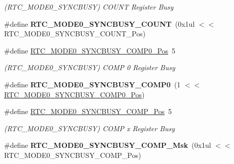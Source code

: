 \begin{DoxyCompactItemize}
\begin{DoxyCompactList}\small\item\em (R\+T\+C\+\_\+\+M\+O\+D\+E0\+\_\+\+S\+Y\+N\+C\+B\+U\+S\+Y) C\+O\+U\+N\+T Register Busy \end{DoxyCompactList}\item 
\hypertarget{group___s_a_m_l21___r_t_c_gac6ea088f1afca302a326d9d2e3dc4095}{}\#define {\bfseries R\+T\+C\+\_\+\+M\+O\+D\+E0\+\_\+\+S\+Y\+N\+C\+B\+U\+S\+Y\+\_\+\+C\+O\+U\+N\+T}~(0x1ul $<$$<$ R\+T\+C\+\_\+\+M\+O\+D\+E0\+\_\+\+S\+Y\+N\+C\+B\+U\+S\+Y\+\_\+\+C\+O\+U\+N\+T\+\_\+\+Pos)\label{group___s_a_m_l21___r_t_c_gac6ea088f1afca302a326d9d2e3dc4095}

\item 
\hypertarget{group___s_a_m_l21___r_t_c_ga2a2ee92850cfa4e215e52e644c61aaf6}{}\#define \hyperlink{group___s_a_m_l21___r_t_c_ga2a2ee92850cfa4e215e52e644c61aaf6}{R\+T\+C\+\_\+\+M\+O\+D\+E0\+\_\+\+S\+Y\+N\+C\+B\+U\+S\+Y\+\_\+\+C\+O\+M\+P0\+\_\+\+Pos}~5\label{group___s_a_m_l21___r_t_c_ga2a2ee92850cfa4e215e52e644c61aaf6}

\begin{DoxyCompactList}\small\item\em (R\+T\+C\+\_\+\+M\+O\+D\+E0\+\_\+\+S\+Y\+N\+C\+B\+U\+S\+Y) C\+O\+M\+P 0 Register Busy \end{DoxyCompactList}\item 
\hypertarget{group___s_a_m_l21___r_t_c_ga36fba959518c4908fa6d012a697e1263}{}\#define {\bfseries R\+T\+C\+\_\+\+M\+O\+D\+E0\+\_\+\+S\+Y\+N\+C\+B\+U\+S\+Y\+\_\+\+C\+O\+M\+P0}~(1 $<$$<$ \hyperlink{group___s_a_m_l21___r_t_c_ga2a2ee92850cfa4e215e52e644c61aaf6}{R\+T\+C\+\_\+\+M\+O\+D\+E0\+\_\+\+S\+Y\+N\+C\+B\+U\+S\+Y\+\_\+\+C\+O\+M\+P0\+\_\+\+Pos})\label{group___s_a_m_l21___r_t_c_ga36fba959518c4908fa6d012a697e1263}

\item 
\hypertarget{group___s_a_m_l21___r_t_c_gafb604affc2cb42251adf429240458e83}{}\#define \hyperlink{group___s_a_m_l21___r_t_c_gafb604affc2cb42251adf429240458e83}{R\+T\+C\+\_\+\+M\+O\+D\+E0\+\_\+\+S\+Y\+N\+C\+B\+U\+S\+Y\+\_\+\+C\+O\+M\+P\+\_\+\+Pos}~5\label{group___s_a_m_l21___r_t_c_gafb604affc2cb42251adf429240458e83}

\begin{DoxyCompactList}\small\item\em (R\+T\+C\+\_\+\+M\+O\+D\+E0\+\_\+\+S\+Y\+N\+C\+B\+U\+S\+Y) C\+O\+M\+P x Register Busy \end{DoxyCompactList}\item 
\hypertarget{group___s_a_m_l21___r_t_c_gacaab5ed7532a4cfe608001b8a0021f6d}{}\#define {\bfseries R\+T\+C\+\_\+\+M\+O\+D\+E0\+\_\+\+S\+Y\+N\+C\+B\+U\+S\+Y\+\_\+\+C\+O\+M\+P\+\_\+\+Msk}~(0x1ul $<$$<$ R\+T\+C\+\_\+\+M\+O\+D\+E0\+\_\+\+S\+Y\+N\+C\+B\+U\+S\+Y\+\_\+\+C\+O\+M\+P\+\_\+\+Pos)\label{group___s_a_m_l21___r_t_c_gacaab5ed7532a4cfe608001b8a0021f6d}


\end{DoxyCompactItemize}
